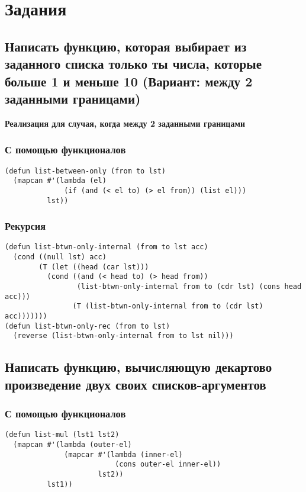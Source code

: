 \chapter{Задания}

\section{Написать функцию, которая выбирает из заданного списка только ты числа, которые больше 1 и меньше 10 (Вариант: между 2 заданными границами)}

\textbf{Реализация для случая, когда между 2 заданными границами}

\subsection{С помощью функционалов}

\begin{lstlisting}
(defun list-between-only (from to lst)
  (mapcan #'(lambda (el)
              (if (and (< el to) (> el from)) (list el)))
          lst))
\end{lstlisting}

\subsection{Рекурсия}

\begin{lstlisting}
(defun list-btwn-only-internal (from to lst acc)
  (cond ((null lst) acc)
        (T (let ((head (car lst)))
          (cond ((and (< head to) (> head from)) 
                 (list-btwn-only-internal from to (cdr lst) (cons head acc)))
                (T (list-btwn-only-internal from to (cdr lst) acc)))))))
(defun list-btwn-only-rec (from to lst)
  (reverse (list-btwn-only-internal from to lst nil)))
\end{lstlisting}

\section{Написать функцию, вычисляющую декартово произведение двух своих списков-аргументов}

\subsection{С помощью функционалов}

\begin{lstlisting}
(defun list-mul (lst1 lst2)
  (mapcan #'(lambda (outer-el)
              (mapcar #'(lambda (inner-el)
                          (cons outer-el inner-el))
                      lst2))
          lst1))
\end{lstlisting}

